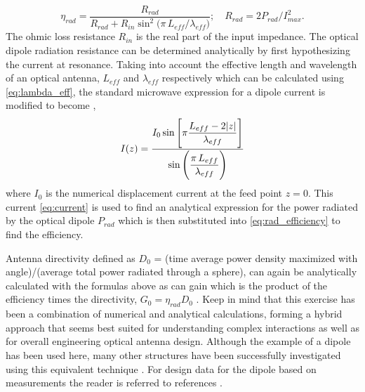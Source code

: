 %
\begin{equation}
  \eta_{rad} = \frac{R_{rad}}{R_{rad} + R_{in} \sin^2(\pi \, L_{eff}/{\lambda _{eff})}}; \quad  R_{rad} = 2 P_{rad}/I_{max}^2.
  \label{eq:rad_efficiency}
\end{equation}
%
The ohmic loss resistance $R_{in}$ is the real part of the input impedance. The optical dipole radiation resistance can be determined analytically by first hypothesizing the current at resonance. Taking into account the effective length and wavelength of an optical antenna, $L_{eff}$ and $\lambda_{eff}$  respectively which can be calculated using \eqref{eq:lambda_eff}, the standard microwave expression for a dipole current is modified to become \cite{Alu2007},
%
\begin{equation}
  I(z) = \frac{\displaystyle I_0 \sin \left [\pi \frac{L_{eff} - 2|z|}{\lambda _{eff}}\right]}{\displaystyle \sin \left( \frac {\pi \, L_{eff}}{\lambda_{eff}} \right)}
  \label{eq:current}
\end{equation}
%
where $I_0$ is the numerical displacement current at the feed point $z = 0$. This current \eqref{eq:current} is used to find an analytical expression for the power radiated by the optical dipole $P_{rad}$ which is then substituted into \eqref{eq:rad_efficiency} to find the efficiency.

Antenna directivity defined as $D_0$ = (time average power density maximized with angle)/(average total power radiated through a sphere), can again be analytically calculated with the formulas above as can gain which is the product of the efficiency times the directivity, $G_0 = \eta_{rad} D_0$ . Keep in mind that this exercise has been a combination of numerical and analytical calculations, forming a hybrid approach that seems best suited for understanding complex interactions as well as for overall engineering optical antenna design.  Although the example of a dipole has been used here, many other structures have been successfully investigated using this equivalent technique \cite{Zhao2011,9781107014145}. For design data for the dipole based on measurements the reader is referred to references \cite{Schuck2005,Fischer2008,Muskens2007}.
